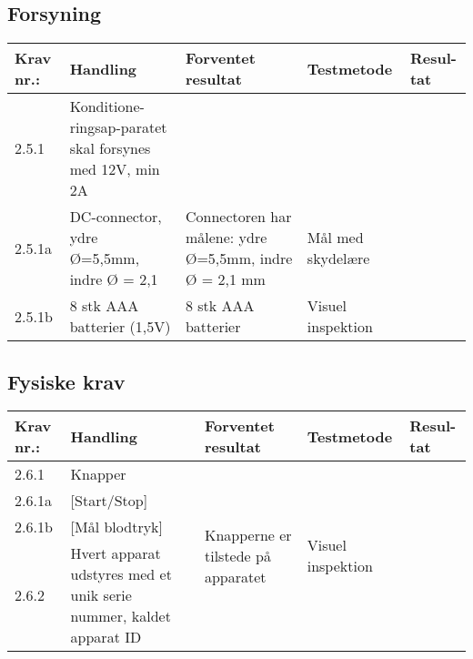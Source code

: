 \documentclass[11pt]{article}
\begin{document}
			\subsection{Forsyning}
			\begin{center}
				\begin{longtable}{|p{1.5cm}|p{2cm}|p{3cm}|p{3cm}|p{1.1cm}|}
					\hline
					Krav nr.: & Handling & Forventet resultat & Testmetode & Resul-tat  \\\hline
					2.5.1& Konditione-ringsap-paratet skal forsynes med 12V, min 2A & &  & \\ \hline
					2.5.1a& DC-connector, ydre Ø=5,5mm, indre Ø = 2,1  & Connectoren har målene: ydre Ø=5,5mm, indre Ø = 2,1 mm & Mål med skydelære  & \\ \hline
					2.5.1b& 8 stk AAA batterier (1,5V)  & 8 stk AAA batterier & Visuel inspektion  & \\ \hline
				\end{longtable}
			\end{center}
			
			\subsection{Fysiske krav}
			\begin{center}
				\begin{longtable}{|p{1.5cm}|p{2cm}|p{3cm}|p{3cm}|p{1.1cm}|}
					\hline
					Krav nr.: & Handling & Forventet resultat & Testmetode & Resul-tat  \\\hline
					2.6.1& Knapper & \multirow{4}{3cm}{Knapperne er tilstede på apparatet}  & \multirow{4}{3cm}{Visuel inspektion}  & \multirow{4}{3cm}{}  \\ \cline{1-2}
					2.6.1a& [Start/Stop] & &  & \\ \cline{1-2}
					2.6.1b& [Mål blodtryk] & &  & \\ \cline{1-2}
					2.6.2& Hvert apparat udstyres med et unik serie nummer, kaldet apparat ID & &  & \\ \hline
				\end{longtable}
			\end{center}
	
	
\end{document}
